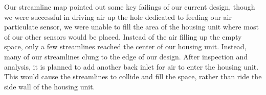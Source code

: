 Our streamline map pointed out some key failings of our current design, though we were successful in driving air up the hole dedicated to feeding our air particulate sensor, we were unable to fill the area of the housing unit where most of our other sensors would be placed. Instead of the air filling up the empty space, only a few streamlines reached the center of our housing unit. Instead, many of our streamlines clung to the edge of our design. After inspection and analysis, it is planned to add another back inlet for air to enter the housing unit. This would cause the streamlines to collide and fill the space, rather than ride the side wall of the housing unit.
